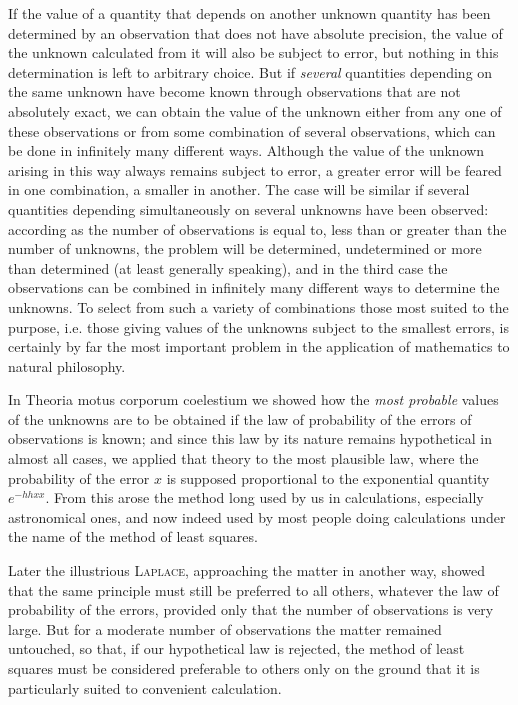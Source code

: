If the value of a quantity that depends on another unknown quantity has been determined by an observation that does not have absolute precision, the value of the unknown calculated from it will also be subject to error, but nothing in this determination is left to arbitrary choice. But if \textit{several} quantities depending on the same unknown have become known through observations that are not absolutely exact, we can obtain the value of the unknown either from any one of these observations or from some combination of several observations, which can be done in infinitely many different ways. Although the value of the unknown arising in this way always remains subject to error, a greater error will be feared in one combination, a smaller in another. The case will be similar if several quantities depending simultaneously on several unknowns have been observed: according as the number of observations is equal to, less than or greater than the number of unknowns, the problem will be determined, undetermined or more than determined (at least generally speaking), and in the third case the observations can be combined in infinitely many different ways to determine the unknowns. To select from such a variety of combinations those most suited to the purpose, i.e. those giving values of the unknowns subject to the smallest errors, is certainly by far the most important problem in the application of mathematics to natural philosophy.

In Theoria motus corporum coelestium we showed how the \textit{most probable} values of the unknowns are to be obtained if the law of probability of the errors of observations is known; and since this law by its nature remains hypothetical in almost all cases, we applied that theory to the most plausible law, where the probability of the error \(x\) is supposed proportional to the exponential quantity \(e^{-hhxx}\). From this arose the method long used by us in calculations, especially astronomical ones, and now indeed used by most people doing calculations under the name of the method of least squares.

Later the illustrious \textsc{Laplace}, approaching the matter in another way, showed that the same principle must still be preferred to all others, whatever the law of probability of the errors, provided only that the number of observations is very large. But for a moderate number of observations the matter remained untouched, so that, if our hypothetical law is rejected, the method of least squares must be considered preferable to others only on the ground that it is particularly suited to convenient calculation.

